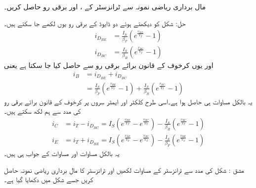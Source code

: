 مال برداری ریاضی نمونہ سے   ٹرانزسٹر کے  ، اور  برقی رو حاصل کریں۔

حل:	شکل   کو دیکھتے ہوئے دو ڈایوڈ کے برقی رو یوں لکھے جا سکتے ہیں۔
\begin{align*}
i_{D_{BE}}&=\frac{I_S}{\beta_F} \left(e^{\frac{v_{BE}}{V_T}}-1 \right )\\
i_{D_{BC}}&=\frac{I_S}{\beta_R} \left(e^{\frac{v_{BC}}{V_T}}-1 \right )
\end{align*}
اور یوں کرخوف کے قانون برائے برقی رو سے   حاصل کیا جا سکتا ہے یعنی
\begin{align}
i_B&=i_{D_{BE}} + i_{D_{BC}}\\
&=\frac{I_S}{\beta_F} \left(e^{\frac{v_{BE}}{V_T}}-1 \right ) +\frac{I_S}{\beta_R} \left(e^{\frac{v_{BC}}{V_T}}-1 \right )
\end{align}
یہ بالکل مساوات  ہی حاصل ہوا ہے۔اسی طرح کلکٹر  اور ایمٹر سروں پر کرخوف کے قانون برائے برقی رو کی مدد سے ہم لکھ سکتے ہیں۔
\begin{align}
i_C&=i_T-i_{D_{BC}}=I_S \left(e^{\frac{v_{BE}}{V_T}}-e^{\frac{v_{BC}}{V_T}} \right )-\frac{I_S}{\beta_R} \left(e^{\frac{v_{BC}}{V_T}}-1 \right )\\
i_E&=i_T+i_{D_{BE}} =I_S \left(e^{\frac{v_{BE}}{V_T}}-e^{\frac{v_{BC}}{V_T}} \right )-\frac{I_S}{\beta_F} \left(e^{\frac{v_{BE}}{V_T}}-1 \right )
\end{align}
یہ بالکل مساوات  اور مساوات   کے جواب ہی ہیں۔ 


مشق : شکل  کی مدد سے  ٹرانزسٹر کے مساوات لکھیں اور ٹرانزسٹر کا مال برداری ریاضی نمونہ حاصل کریں جسے شکل  میں دکھایا گیا ہے۔

